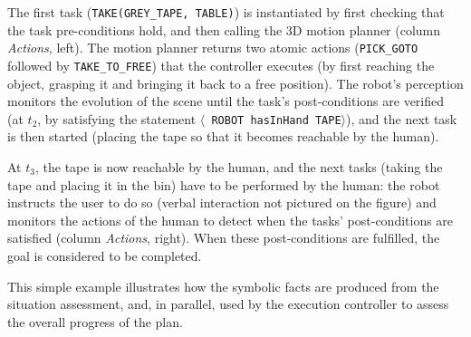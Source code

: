 \documentclass[preprint,3p,times]{elsarticle}
\newcommand{\stmt}[1]{{\footnotesize \tt $\langle$ #1\relax$\rangle$}}
\begin{document}
The first task ({\tt TAKE(GREY\_TAPE, TABLE)}) is instantiated by first checking
that the task pre-conditions hold, and then calling the 3D motion planner
(column \emph{Actions}, left). The motion planner returns two atomic actions
({\tt PICK\_GOTO} followed by {\tt TAKE\_TO\_FREE}) that the controller executes
(by first reaching the object, grasping it and bringing it back to a free
position).  The robot's perception monitors the evolution of the scene until the
task's post-conditions are verified (at $t_2$, by satisfying the statement
\stmt{ROBOT hasInHand TAPE}), and the next task is then started (placing the
tape so that it becomes reachable by the human).

At $t_3$, the tape is now reachable by the human, and the next tasks (taking the
tape and placing it in the bin) have to be performed by the human: the robot
instructs the user to do so (verbal interaction not pictured on the figure) and
monitors the actions of the human to detect when the tasks' post-conditions are
satisfied (column \emph{Actions}, right). When these post-conditions are
fulfilled, the goal is considered to be completed.

This simple example illustrates how the symbolic facts are produced from the
situation assessment, and, in parallel, used by the execution controller to
assess the overall progress of the plan.
\end{document}
